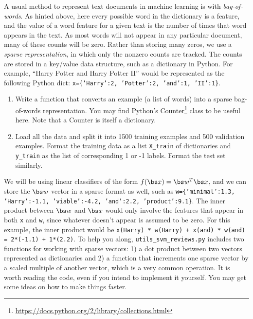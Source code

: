 \documentclass{article}
\newcommand{\code}[1]{\texttt{#1}}
\theoremstyle{plain}
\theoremstyle{definition}
\begin{document}
A usual method to represent text documents in machine learning
is with \emph{bag-of-words}. As hinted above, here every possible word in the dictionary is a feature, and the value of a word feature for a given text is the number of times that word appears in the text. As most words will not appear in any particular document, many of these counts will be zero.
Rather than storing many zeros, we use a \emph{sparse representation},
in which only the nonzero counts are tracked. The counts are
stored in a key/value data structure, such as a dictionary in Python. For
example, ``Harry Potter and Harry Potter II'' would be represented
as the following Python dict: \code{x=\{'Harry':2, 'Potter':2, 'and':1, 'II':1\}}.


\begin{enumerate}
  \setcounter{enumi}{\value{saveenum}}
\item Write a function that converts an example (a list of words) into
a sparse bag-of-words representation. You may find Python's Counter\footnote{\url{https://docs.python.org/2/library/collections.html}}
class to be useful here. Note that a Counter is itself a dictionary.
\item Load all the data and split it into 1500 training examples
and 500 validation examples. Format the training data as a list \code{X\_train} of dictionaries and \code{y\_train} as the list of corresponding 1 or -1 labels. Format the test set similarly.
\setcounter{saveenum}{\value{enumi}}
\end{enumerate}




We will be using linear classifiers of the form $f(\bs x)=\bs w^{T} \bs x$, and
we can store the $\bs w$ vector in a sparse format as well, such as \code{w=\{'minimal':1.3, 'Harry':-1.1, 'viable':-4.2, 'and':2.2, 'product':9.1\}}.
The inner product between $\bs w$ and $\bs x$ would only involve the features
that appear in both \code{x} and \code{w}, since whatever doesn't
appear is assumed to be zero. For this example, the inner product
would be \code{x(Harry) {*} w(Harry) + x(and) {*} w(and) = 2{*}(-1.1)
+ 1{*}(2.2)}. To help you along, \code{utils\_svm\_reviews.py} includes two functions for working with
sparse vectors: 1) a dot product between two vectors represented as
dictionaries and 2) a function that increments one sparse vector by a scaled
multiple of another vector, which is a very common operation. It is
worth reading the code, even if you intend to implement it yourself.
You may get some ideas on how to make things faster. 
\end{document}
